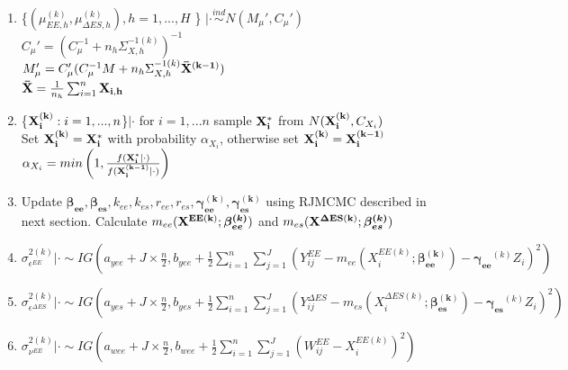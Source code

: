 \documentclass[11pt]{article}\usepackage[]{graphicx}\usepackage[]{color}
\begin{document}
\begin{enumerate}
\begin{enumerate}
\item
 \{$(\mu_{EE,h}^{(k)},\mu_{\Delta ES,h}^{(k)}), h=1,...,H$ \} $|\cdot \overset{ind}{\sim} N(M_{\mu}',C_{\mu}')$ \\
$C_{\mu}' = (C_{\mu}^{-1} + n_h \Sigma_{X,h}^{-1(k)})^{-1}$ \\
$M_{\mu}' = C_{\mu}'(C_{\mu}^{-1}M + n_h \Sigma_{X,h}^{-1(k)} {\bf \bar{X}^{(k-1)}})$ \\
${\bf \bar{X}} = \frac{1}{n_h}\sum_{i=1}^{n} {\bf X_{i,h}}$ \\

 

\item
\{${\bf X_i^{(k)}}:i=1,...,n $\}$|\cdot$ for $i=1,...n$ sample ${\bf X_i^*}$ from $N({\bf X_i^{(k)}},C_{X_i})$ \\

Set ${\bf X_i^{(k)}} = {\bf X_i^*}$ with probability $\alpha_{X_i}$, otherwise set ${\bf X_i^{(k)}} = {\bf X_i^{(k-1)}}$ \\

$\alpha_{X_i} = min\left(1, \frac{f({\bf X_i^*}|\cdot)}{f({\bf X_i^{(k-1)}}|\cdot)}  \right)$ \\

\item
Update ${\boldsymbol{\beta_{ee}},\boldsymbol{\beta_{es}}},k_{ee},k_{es}, {  r_{ee}, r_{es}}, \boldsymbol{\gamma_{ee}^{(k)}}, \boldsymbol{\gamma_{es}^{(k)}}$ using RJMCMC described in next section. Calculate $m_{ee}({\bf X^{EE(k)}};\boldsymbol{\beta_{ee}^{(k)}})$ and $m_{es}({\bf X^{\Delta ES(k)}};\boldsymbol{\beta_{es}^{(k)}})$ \\

\item
 $\sigma^{2(k)}_{\epsilon^{EE}} |\cdot \sim IG(a_{yee}+J\times \frac{n}{2},b_{yee}+\frac{1}{2}\sum_{i=1}^{n}\sum_{j=1}^{J}(Y_{ij}^{EE}-m_{ee}(X_i^{EE(k)};\boldsymbol{\beta_{ee}^{(k)}})-\boldsymbol{\gamma_{ee}}^{(k)}Z_i)^2)$ \\
 

\item
 $\sigma^{2(k)}_{\epsilon^{\Delta ES}} |\cdot \sim IG(a_{yes}+J\times \frac{n}{2},b_{yes}+\frac{1}{2}\sum_{i=1}^{n}\sum_{j=1}^{J}(Y_{ij}^{\Delta ES}-m_{es}(X_i^{\Delta ES(k)};\boldsymbol{\beta_{es}^{(k)}})-\boldsymbol{\gamma_{es}}^{(k)}Z_i)^2)$ \\
 
 
\item
 $\sigma^{2(k)}_{\nu^{EE}} |\cdot \sim IG(a_{wee}+J\times \frac{n}{2},b_{wee}+\frac{1}{2}\sum_{i=1}^{n}\sum_{j=1}^{J}(W_{ij}^{EE}-X_i^{EE(k)})^2)$ \\
 

\end{enumerate}
\end{enumerate}
\end{document}
